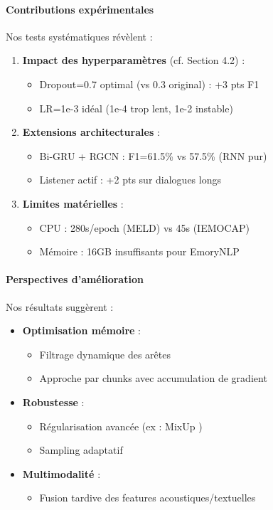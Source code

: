 \documentclass[a4paper,11pt]{article}
\begin{document}
\paragraph{Contributions expérimentales}
Nos tests systématiques révèlent :

\begin{enumerate}
  \item \textbf{Impact des hyperparamètres} (cf. Section 4.2) :
  \begin{itemize}
    \item Dropout=0.7 optimal (vs 0.3 original) : +3 pts F1
    \item LR=1e-3 idéal (1e-4 trop lent, 1e-2 instable)
  \end{itemize}

  \item \textbf{Extensions architecturales} :
  \begin{itemize}
    \item Bi-GRU + RGCN : F1=61.5\% vs 57.5\% (RNN pur)
    \item Listener actif : +2 pts sur dialogues longs
  \end{itemize}

  \item \textbf{Limites matérielles} :
  \begin{itemize}
    \item CPU : 280s/epoch (MELD) vs 45s (IEMOCAP)
    \item Mémoire : 16GB insuffisants pour EmoryNLP
  \end{itemize}
\end{enumerate}

\paragraph{Perspectives d'amélioration}
Nos résultats suggèrent :

\begin{itemize}
  \item \textbf{Optimisation mémoire} :
  \begin{itemize}
    \item Filtrage dynamique des arêtes \cite{zhangetal2019memory}
    \item Approche par chunks avec accumulation de gradient
  \end{itemize}

  \item \textbf{Robustesse} :
  \begin{itemize}
    \item Régularisation avancée (ex : MixUp \cite{zhang2018mixup})
    \item Sampling adaptatif \cite{zhang-etal-2020-adapters}
  \end{itemize}

  \item \textbf{Multimodalité} :
  \begin{itemize}
    \item Fusion tardive des features acoustiques/textuelles \cite{poria2020misa}
  \end{itemize}
\end{itemize}
\end{document}
